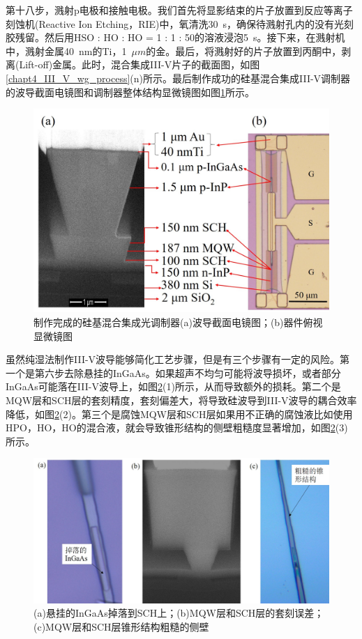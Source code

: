 第十八步，溅射p电极和接触电极。我们首先将显影结束的片子放置到反应等离子刻蚀机(Reactive Ion Etching，RIE)中，氧清洗30~s，确保待溅射孔内的没有光刻胶残留。然后用HSO : HO : HO = 1 : 1 : 50的溶液浸泡5~s。接下来，在溅射机中，溅射金属40~nm的Ti，1~$\mu m$的金。最后，将溅射好的片子放置到丙酮中，剥离(Lift-off)金属。此时，混合集成III-V片子的截面图，如图\ref{chapt4_III_V_wg_process}(n)所示。最后制作成功的硅基混合集成III-V调制器的波导截面电镜图和调制器整体结构显微镜图如图\ref{chapt4_III_V_results}所示。
\begin{figure}[htb]
	\centering
	\includegraphics[width=12cm]{./Pictures/chapt4_III_V_results.jpg}
	\caption{制作完成的硅基混合集成光调制器(a)波导截面电镜图；(b)器件俯视显微镜图}
	\label{chapt4_III_V_results}
\end{figure}

虽然纯湿法制作III-V波导能够简化工艺步骤，但是有三个步骤有一定的风险。第一个是第六步去除悬挂的InGaAs。如果超声不均匀可能将波导损坏，或者部分InGaAs可能落在III-V波导上，如图\ref{chapt4_III_V_wrong_results}(1)所示，从而导致额外的损耗。第二个是MQW层和SCH层的套刻精度，套刻偏差大，将导致硅波导到III-V波导的耦合效率降低，如图\ref{chapt4_III_V_wrong_results}(2)。第三个是腐蚀MQW层和SCH层如果用不正确的腐蚀液比如使用HPO，HO，HO的混合液，就会导致锥形结构的侧壁粗糙度显著增加，如图\ref{chapt4_III_V_wrong_results}(3)所示。
\begin{figure}[htb]
	\centering
	\includegraphics[width=14cm]{./Pictures/chapt4_III_V_wrong_results.jpg}
	\caption{(a)悬挂的InGaAs掉落到SCH上；(b)MQW层和SCH层的套刻误差；(c)MQW层和SCH层锥形结构粗糙的侧壁}
	\label{chapt4_III_V_wrong_results}
\end{figure}

